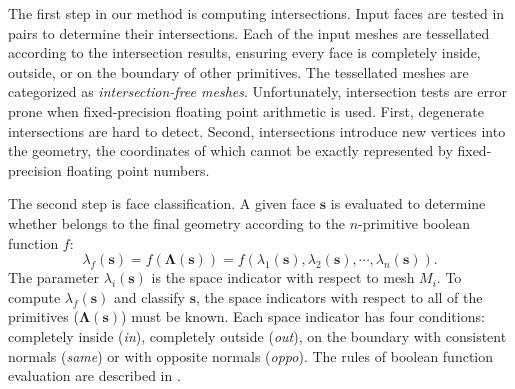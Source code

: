 
The first step in our method is computing intersections. Input faces are tested in pairs to determine their intersections. Each of the input meshes are tessellated according to the intersection results, ensuring every face is completely inside, outside, or on the boundary of other primitives. The tessellated meshes are categorized as \emph{intersection-free meshes}. Unfortunately, intersection tests are error prone when fixed-precision floating point arithmetic is used. First, degenerate intersections are hard to detect. Second, intersections introduce new vertices into the geometry, the coordinates of which cannot be exactly represented by fixed-precision floating point numbers.

The second step is face classification. A given face $\bm{s}$ is evaluated to determine whether belongs to the final geometry according to the $n$-primitive boolean function $f$:
\begin{equation}
\lambda_f(\bm{s}) = f(\boldsymbol{\Lambda}(\bm{s})) = f(\lambda_1(\bm{s}), \lambda_2(\bm{s}), \cdots, \lambda_n(\bm{s})).
\end{equation}
The parameter $\lambda_i(\bm{s})$ is the space indicator with respect to mesh $M_i$. To compute $\lambda_f(\bm{s})$ and classify $\bm{s}$, the space indicators with respect to all of the primitives ($\boldsymbol{\Lambda}(\bm{s})$) must be known. Each space indicator has four conditions: completely inside (\emph{in}), completely outside (\emph{out}), on the boundary with consistent normals (\emph{same}) or with opposite normals (\emph{oppo}). The rules of boolean function evaluation are described in \cite{douze2015quickcsg,feito2013fast}.

